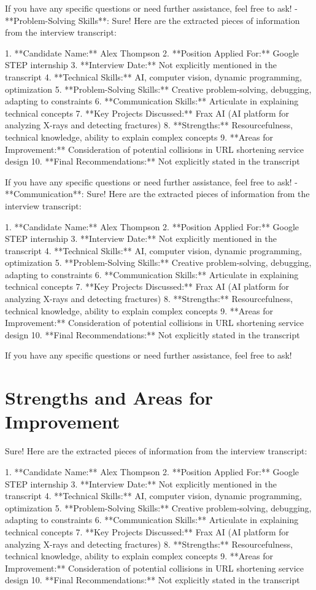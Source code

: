 \documentclass{article}
\begin{document}
If you have any specific questions or need further assistance, feel free to ask!
- **Problem-Solving Skills**: Sure! Here are the extracted pieces of information from the interview transcript:

1. **Candidate Name:** Alex Thompson
2. **Position Applied For:** Google STEP internship
3. **Interview Date:** Not explicitly mentioned in the transcript
4. **Technical Skills:** AI, computer vision, dynamic programming, optimization
5. **Problem-Solving Skills:** Creative problem-solving, debugging, adapting to constraints
6. **Communication Skills:** Articulate in explaining technical concepts
7. **Key Projects Discussed:** Frax AI (AI platform for analyzing X-rays and detecting fractures)
8. **Strengths:** Resourcefulness, technical knowledge, ability to explain complex concepts
9. **Areas for Improvement:** Consideration of potential collisions in URL shortening service design
10. **Final Recommendations:** Not explicitly stated in the transcript

If you have any specific questions or need further assistance, feel free to ask!
- **Communication**: Sure! Here are the extracted pieces of information from the interview transcript:

1. **Candidate Name:** Alex Thompson
2. **Position Applied For:** Google STEP internship
3. **Interview Date:** Not explicitly mentioned in the transcript
4. **Technical Skills:** AI, computer vision, dynamic programming, optimization
5. **Problem-Solving Skills:** Creative problem-solving, debugging, adapting to constraints
6. **Communication Skills:** Articulate in explaining technical concepts
7. **Key Projects Discussed:** Frax AI (AI platform for analyzing X-rays and detecting fractures)
8. **Strengths:** Resourcefulness, technical knowledge, ability to explain complex concepts
9. **Areas for Improvement:** Consideration of potential collisions in URL shortening service design
10. **Final Recommendations:** Not explicitly stated in the transcript

If you have any specific questions or need further assistance, feel free to ask!

\section{Strengths and Areas for Improvement}
Sure! Here are the extracted pieces of information from the interview transcript:

1. **Candidate Name:** Alex Thompson
2. **Position Applied For:** Google STEP internship
3. **Interview Date:** Not explicitly mentioned in the transcript
4. **Technical Skills:** AI, computer vision, dynamic programming, optimization
5. **Problem-Solving Skills:** Creative problem-solving, debugging, adapting to constraints
6. **Communication Skills:** Articulate in explaining technical concepts
7. **Key Projects Discussed:** Frax AI (AI platform for analyzing X-rays and detecting fractures)
8. **Strengths:** Resourcefulness, technical knowledge, ability to explain complex concepts
9. **Areas for Improvement:** Consideration of potential collisions in URL shortening service design
10. **Final Recommendations:** Not explicitly stated in the transcript
\end{document}
